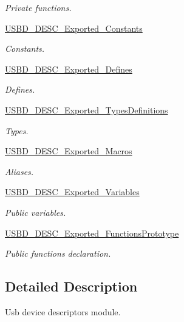 \begin{DoxyCompactItemize}
\begin{DoxyCompactList}\small\item\em Private functions. \end{DoxyCompactList}\item 
\hyperlink{group__USBD__DESC__Exported__Constants}{U\+S\+B\+D\+\_\+\+D\+E\+S\+C\+\_\+\+Exported\+\_\+\+Constants}
\begin{DoxyCompactList}\small\item\em Constants. \end{DoxyCompactList}\item 
\hyperlink{group__USBD__DESC__Exported__Defines}{U\+S\+B\+D\+\_\+\+D\+E\+S\+C\+\_\+\+Exported\+\_\+\+Defines}
\begin{DoxyCompactList}\small\item\em Defines. \end{DoxyCompactList}\item 
\hyperlink{group__USBD__DESC__Exported__TypesDefinitions}{U\+S\+B\+D\+\_\+\+D\+E\+S\+C\+\_\+\+Exported\+\_\+\+Types\+Definitions}
\begin{DoxyCompactList}\small\item\em Types. \end{DoxyCompactList}\item 
\hyperlink{group__USBD__DESC__Exported__Macros}{U\+S\+B\+D\+\_\+\+D\+E\+S\+C\+\_\+\+Exported\+\_\+\+Macros}
\begin{DoxyCompactList}\small\item\em Aliases. \end{DoxyCompactList}\item 
\hyperlink{group__USBD__DESC__Exported__Variables}{U\+S\+B\+D\+\_\+\+D\+E\+S\+C\+\_\+\+Exported\+\_\+\+Variables}
\begin{DoxyCompactList}\small\item\em Public variables. \end{DoxyCompactList}\item 
\hyperlink{group__USBD__DESC__Exported__FunctionsPrototype}{U\+S\+B\+D\+\_\+\+D\+E\+S\+C\+\_\+\+Exported\+\_\+\+Functions\+Prototype}
\begin{DoxyCompactList}\small\item\em Public functions declaration. \end{DoxyCompactList}\end{DoxyCompactItemize}


\subsection{Detailed Description}
Usb device descriptors module. 

